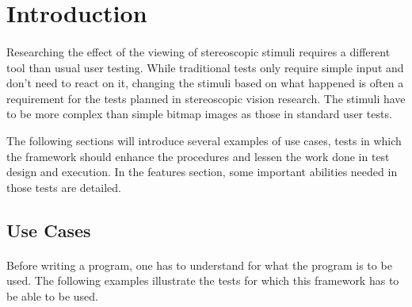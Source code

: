 \section{Introduction\label{Introduction}}
\paragraph{}
Researching the effect of the viewing of stereoscopic stimuli requires a different tool than usual user testing.
While traditional tests only require simple input and don't need to react on it, changing the stimuli based on what happened is often a requirement for the tests planned in stereoscopic vision research.
The stimuli have to be more complex than simple bitmap images as those in standard user tests.

The following sections will introduce several examples of use cases, tests in which the framework should enhance the procedures and lessen the work done in test design and execution.
In the features section, some important abilities needed in those tests are detailed.

\subsection{Use Cases}
\paragraph{}
Before writing a program, one has to understand for what the program is to be used. The following examples illustrate the tests for which this framework has to be able to be used.

